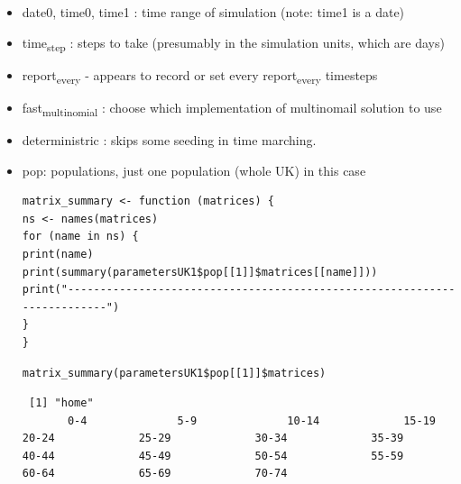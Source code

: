 \documentclass[11pt]{article}
\begin{document}
\begin{itemize}
\item date0, time0, time1 : time range of simulation (note: time1 is a date)
\item time\textsubscript{step} : steps to take (presumably in the simulation units, which are days)
\item report\textsubscript{every} - appears to record or set every report\textsubscript{every} timesteps
\item fast\textsubscript{multinomial} : choose which implementation of multinomail solution to use
\item deterministric : skips some seeding in time marching.
\item pop: populations, just one population (whole UK) in this case

\begin{verbatim}
matrix_summary <- function (matrices) {
ns <- names(matrices)
for (name in ns) {
print(name)
print(summary(parametersUK1$pop[[1]]$matrices[[name]]))
print("-------------------------------------------------------------------------")
}
}
\end{verbatim}

\begin{verbatim}
matrix_summary(parametersUK1$pop[[1]]$matrices)
\end{verbatim}

\begin{verbatim}
 [1] "home"
       0-4              5-9              10-14             15-19            20-24             25-29             30-34             35-39             40-44             45-49             50-54             55-59             60-64             65-69             70-74


\end{verbatim}
\end{itemize}
\end{document}
